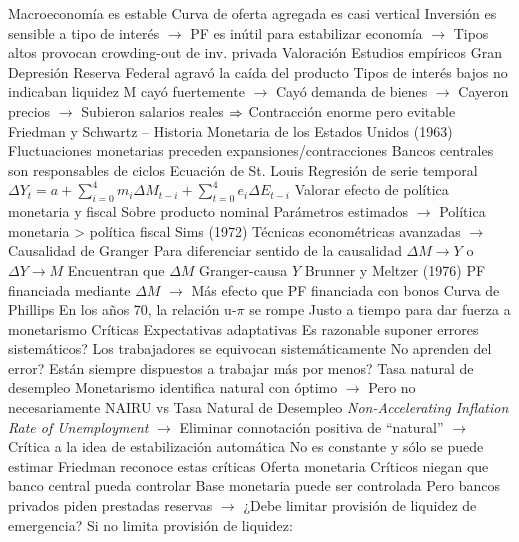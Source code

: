 \documentclass{nuevotema}
\begin{document}
\begin{esquemal}
				\4[] Macroeconomía es estable
				\4[] Curva de oferta agregada es casi vertical
				\4[] Inversión es sensible a tipo de interés
				\4[] $\to$ PF es inútil para estabilizar economía
				\4[] $\to$ Tipos altos provocan crowding-out de inv. privada
		\2 Valoración
			\3 Estudios empíricos
				\4 {Gran Depresión}
				\4[] Reserva Federal agravó la caída del producto
				\4[] Tipos de interés bajos no indicaban liquidez
				\4[] M cayó fuertemente
				\4[] $\to$ Cayó demanda de bienes
				\4[] $\to$ Cayeron precios
				\4[] $\to$ Subieron salarios reales
				\4[] $\Rightarrow$ Contracción enorme pero evitable
				\4 {Friedman y Schwartz -- Historia Monetaria de los Estados Unidos (1963)}
				\4[] Fluctuaciones monetarias preceden expansiones/contracciones
				\4[] Bancos centrales son responsables de ciclos
				\4 {Ecuación de St. Louis}
				\4 Regresión de serie temporal
				\4[] $\Delta Y_t = a  + \sum_{i=0}^4 m_i \Delta M_{t-i} + \sum_{t=0}^4 e_i \Delta E_{t-i}$
				\4 Valorar efecto de política monetaria y fiscal
				\4[] Sobre producto nominal
				\4 Parámetros estimados
				\4[] $\to$ Política monetaria > política fiscal
				\4 Sims (1972)
				\4[] Técnicas econométricas avanzadas
				\4[] $\to$ Causalidad de Granger
				\4[] Para diferenciar sentido de la causalidad
				\4[] $\Delta M \to Y$ o $\Delta Y \to M$
				\4[] Encuentran que $\Delta M$ Granger-causa $Y$
				\4 Brunner y Meltzer (1976)
				\4[] PF financiada mediante $\Delta M$
				\4[] $\to$ Más efecto que PF financiada con bonos
				\4 Curva de Phillips
				\4[] En los años 70, la relación u-$\pi$ se rompe
				\4[] Justo a tiempo para dar fuerza a monetarismo
			\3 Críticas
				\4 Expectativas adaptativas
				\4[] Es razonable suponer errores sistemáticos?
				\4[] Los trabajadores se equivocan sistemáticamente
				\4[] No aprenden del error?
				\4[] Están siempre dispuestos a trabajar más por menos?
				\4 Tasa natural de desempleo
				\4[] Monetarismo identifica natural con óptimo
				\4[] $\to$ Pero no necesariamente
				\4 NAIRU vs Tasa Natural de Desempleo
				\4[] \textit{Non-Accelerating Inflation Rate of Unemployment}
				\4[] $\to$ Eliminar connotación positiva de ``natural''
				\4[] $\to$ Crítica a la idea de estabilización automática
				\4 No es constante y sólo se puede estimar
				\4[] Friedman reconoce estas críticas
				\4 Oferta monetaria
				\4[] Críticos niegan que banco central pueda controlar
				\4[] Base monetaria puede ser controlada
				\4[] Pero bancos privados piden prestadas reservas
				\4[] $\to$ ¿Debe limitar provisión de liquidez de emergencia?
				\4[] Si no limita provisión de liquidez:

\end{esquemal}
\end{document}
